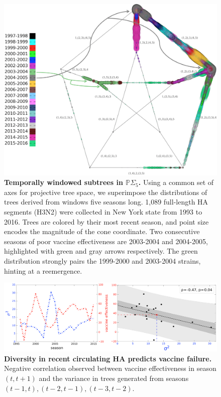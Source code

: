 \documentclass[a4paper,11pt]{article}
\begin{document}
\begin{figure}
    \centering
    \includegraphics[width=6in]{../figures/influenza_quint.png}
    \caption{{\bf Temporally windowed subtrees in $\mathbb{P}\Sigma_5$.} Using a common set of axes for projective tree space, we superimpose the distributions of trees derived from windows five seasons long. 1,089 full-length HA segments (H3N2) were collected in New York state from 1993 to 2016. Trees are colored by their most recent season, and point size encodes the magnitude of the cone coordinate. Two consecutive seasons of poor vaccine effectiveness are 2003-2004 and 2004-2005, highlighted with green and gray arrows respectively. The green distribution strongly pairs the 1999-2000 and 2003-2004 strains, hinting at a reemergence.}
    \label{fig:flu_quint}
\end{figure}

\begin{figure}
    \centering
    \includegraphics[width=\linewidth]{../figures/influenza_VE.png}
    \caption{{\bf Diversity in recent circulating HA predicts vaccine failure.} Negative correlation observed between vaccine effectiveness in season $(t, t+1)$ and the variance in trees generated from seasons $(t-1, t), (t-2, t-1), (t-3, t-2)$.}
    \label{fig:flu_VE}
\end{figure}
\end{document}

